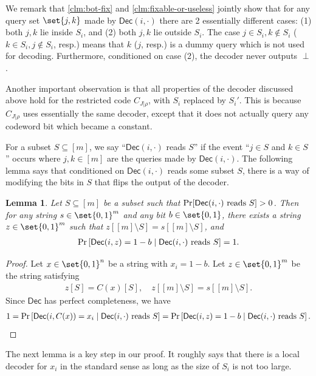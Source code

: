 \documentclass[10pt,a4paper]{article}
\newtheorem{lemma}{Lemma}
\theoremstyle{remark}
\newcommand{\Dec}{\ensuremath{\mathsf{Dec}}\xspace}
\begin{document}
We remark that \cref{clm:bot-fix} and \cref{clm:fixable-or-useless} jointly show that for any query set $\set{j,k}$ made by $\Dec(i,\cdot)$ there are 2 essentially different cases: (1) both $j, k$ lie inside $S_i$, and (2) both $j, k$ lie outside $S_i$. The case $j \in S_i, k\notin S_i$ ($k \in S_i, j\notin S_i$, resp.) means that $k$ ($j$, resp.) is a dummy query which is not used for decoding. Furthermore, conditioned on case (2), the decoder never outputs $\perp$.

Another important observation is that all properties of the decoder discussed above hold for the restricted code $C_{J|\rho}$, with $S_i$ replaced by $S_i'$. This is because $C_{J|\rho}$ uses essentially the same decoder, except that it does not actually query any codeword bit which became a constant.

For a subset $S \subseteq [m]$,
we say ``$\Dec(i,\cdot)$ reads $S$'' if the event ``$j \in S$ and $k \in S$'' occurs where $j, k \in [m]$ are the queries made by $\Dec(i,\cdot)$. The following lemma says that conditioned on $\Dec(i,\cdot)$ reads some subset $S$, there is a way of modifying the bits in $S$ that flips the output of the decoder.

\begin{lemma} \label{lem:conditional-zero}
Let $S \subseteq [m]$ be a subset such that $\Pr[\Dec(i,\cdot)\textup{ reads }S]>0$. Then for any string $s \in \set{0,1}^m$ and any bit $b \in \set{0,1}$, there exists a string $z \in \set{0,1}^m$ such that $z[[m]\setminus S]=s[[m]\setminus S]$, and 
\begin{align*}
	\Pr\left[ \Dec(i, z) = 1-b \mid \Dec(i,\cdot)\textup{ reads }S \right] = 1.
\end{align*}
\end{lemma}
\begin{proof}
Let $x \in \set{0,1}^{n}$ be a string with $x_i=1-b$. Let $z \in \set{0,1}^{m}$ be the string satisfying 
\begin{align*}
z[S] = C(x)[S], \quad z[[m]\setminus S] = s[[m]\setminus S]. 
\end{align*}
Since $\Dec$ has perfect completeness, we have
\begin{align*}
	1 = \Pr\left[ \Dec(i, C(x)) = x_i \mid \Dec(i,\cdot)\textup{ reads }S \right] = \Pr\left[ \Dec(i, z) = 1-b \mid \Dec(i,\cdot)\textup{ reads }S \right].
\end{align*}
\end{proof}

The next lemma is a key step in our proof. It roughly says that there is a local decoder for $x_i$ in the standard sense as long as the size of $S_{i}$ is not too large.
\end{document}
